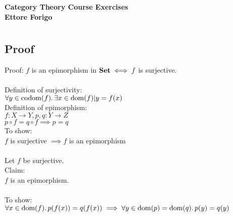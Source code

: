 \documentclass[a4paper, twoside, english, 11pt]{book}
\DeclareMathOperator{\dom}{dom}
\DeclareMathOperator{\codom}{codom}
\newcommand{\catname}[1]{{\normalfont\textbf{#1}}}
\newcommand{\Set}{\catname{Set}}
\begin{document}
\pagestyle{headings}

\frontmatter

\begin{titlepage}
	\begin{center}
		{\huge \bfseries Category Theory Course Exercises \\}
		\vspace{1.5cm}
		{\Large \bfseries Ettore Forigo}
	\end{center}
\end{titlepage}

\mainmatter

\chapter{}



\section{Proof}

Proof: $f$ is an epimorphism in $\Set \iff f$ is surjective. \\\\

\noindent
Definition of surjectivity: \\
\indent
$\forall y \in \codom(f) \ldotp \exists x \in \dom(f) | y = f(x)$ \\

\noindent
Definition of epimorphism: \\
\indent
$f : X \rightarrow Y, p,q : Y \rightarrow Z$ \\
\indent
$p \circ f = q \circ f \implies p = q$ \\

\noindent
To show: \\

$f$ is surjective $\implies f$ is an epimorphism \\\\

\noindent
Let $f$ be surjective. \\

\noindent
Claim: \\

$f$ is an epimorphism. \\\\

\noindent
To show: \\

\noindent
$\forall x \in \dom(f) \ldotp p(f(x)) = q(f(x)) \implies \forall y \in \dom(p) = \dom(q) \ldotp p(y) = q(y)$ \\
\end{document}

